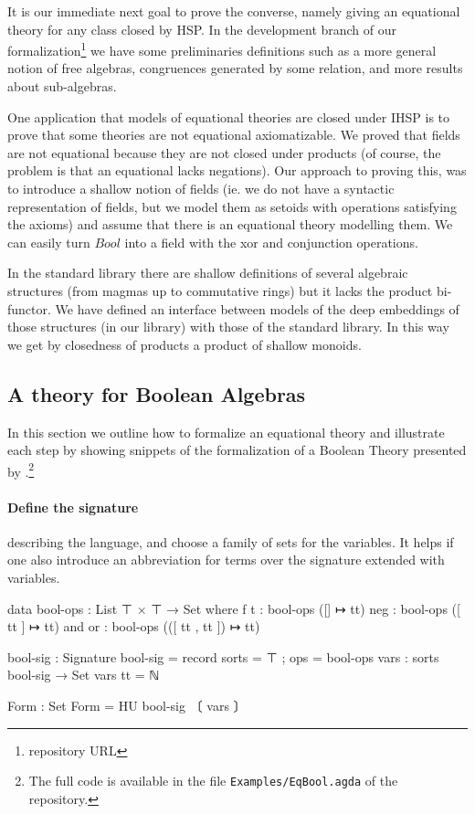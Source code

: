 
It is our immediate next goal to prove the converse, namely giving an
equational theory for any class closed by HSP. In the development
branch of our formalization\footnote{repository URL} we have some
preliminaries definitions such as a more general notion of free
algebras, congruences generated by some relation, and more results
about sub-algebras.

One application that models of equational theories are closed under
IHSP is to prove that some theories are not equational
axiomatizable. We proved that fields are not equational because they
are not closed under products (of course, the problem is that an
equational lacks negations). Our approach to proving this, was to
introduce a shallow notion of fields (ie. we do not have a syntactic
representation of fields, but we model them as setoids with operations
satisfying the axioms) and assume that there is an equational theory
modelling them. We can easily turn $\mathit{Bool}$ into a field with
the xor and conjunction operations. %

In the standard library there are shallow definitions of several
algebraic structures (from magmas up to commutative rings) but it
lacks the product bi-functor. We have defined an interface between
models of the deep embeddings of those structures (in our library)
with those of the standard library. In this way we get by closedness
of products a product of shallow monoids.

\subsection{A theory for Boolean Algebras }\label{sec:eqlog-theory-ol}
In this section we outline
how to formalize an equational theory and illustrate each step by
showing snippets of the formalization of a Boolean Theory presented by
\cite{DBLP:conf/RelMiCS/RochaM08}.\footnote{The full code is available
  in the file \nolinkurl{Examples/EqBool.agda} of the repository.}

\paragraph*{Define the signature}
\label{sec:define-signature} describing the language, and choose
  a family of sets for the variables. It helps if one also introduce
  an abbreviation for terms over the signature extended with
  variables.
\begin{spec}
data bool-ops : List ⊤ × ⊤ → Set where
  f t    : bool-ops ([] ↦ tt)
  neg  : bool-ops ([ tt ] ↦ tt)
  and or  : bool-ops (([ tt , tt ]) ↦ tt)

bool-sig : Signature
bool-sig = record { sorts = ⊤ ; ops = bool-ops }
vars : sorts bool-sig → Set
vars tt = ℕ

Form : Set
Form = HU bool-sig 〔 vars 〕
\end{spec}

